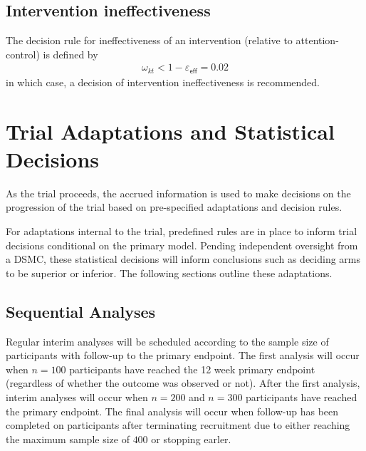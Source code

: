 \documentclass[
]{article}
\begin{document}
\hypertarget{intervention-ineffectiveness}{%
  \subsection{Intervention ineffectiveness}\label{intervention-ineffectiveness}}

The decision rule for ineffectiveness of an intervention (relative to attention-control) is defined by
$$
  \begin{aligned}
    \omega_{kt} < 1 - \varepsilon_{\mathsf{eff}} = 0.02
  \end{aligned}
$$
in which case, a decision of intervention ineffectiveness is recommended.

\clearpage

\hypertarget{trial-adaptations-and-statistical-decisions}{%
  \section{Trial Adaptations and Statistical Decisions}\label{trial-adaptations-and-statistical-decisions}}

As the trial proceeds, the accrued information is used to make decisions on the progression of the trial based on pre-specified adaptations and decision rules.

For adaptations internal to the trial, predefined rules are in place to inform trial decisions conditional on the primary model.
Pending independent oversight from a DSMC, these statistical decisions will inform conclusions such as deciding arms to be superior or inferior.
The following sections outline these adaptations.

\hypertarget{sequential-analyses}{%
  \subsection{Sequential Analyses}\label{sequential-analyses}}

Regular interim analyses will be scheduled according to the sample size of participants with follow-up to the primary endpoint.
The first analysis will occur when \(n=100\) participants have reached the 12 week primary endpoint (regardless of whether the outcome was observed or not).
After the first analysis, interim analyses will occur when $n=200$ and $n=300$ participants have reached the primary endpoint.
The final analysis will occur when follow-up has been completed on participants after terminating recruitment due to either reaching the maximum sample size of \(400\) or stopping earler.
\end{document}
